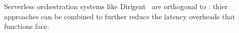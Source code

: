 Serverless orchestration systems like Dirigent~\cite{dirigent} are orthogonal to
\sys{}: thier approaches can be combined to further reduce the latency overheads
that functions face.

